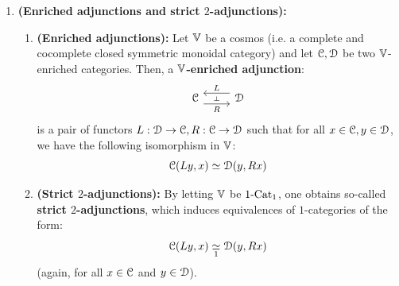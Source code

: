                 \begin{remark} \label{remark: objects_and_morphisms_of_grothendieck_constructions}
                    
                \end{remark}
                
                \begin{remark} \label{remark: 2_adjunctions}
                    \noindent
                    \begin{enumerate}
                        \item \textbf{(Enriched adjunctions and strict $2$-adjunctions):} 
                            \begin{enumerate}
                                \item \textbf{(Enriched adjunctions):} Let $\mathbb{V}$ be a cosmos (i.e. a complete and cocomplete closed symmetric monoidal category) and let $\mathcal{C}, \mathcal{D}$ be two $\mathbb{V}$-enriched categories. Then, a \textbf{$\mathbb{V}$-enriched adjunction}:
                                    $$
                                        \begin{tikzcd}
                                        	\C & \D
                                        	\arrow[""{name=0, anchor=center, inner sep=0}, "R"', shift right=2, from=1-1, to=1-2]
                                        	\arrow[""{name=1, anchor=center, inner sep=0}, "L"', shift right=2, from=1-2, to=1-1]
                                        	\arrow["\dashv"{anchor=center, rotate=-90}, draw=none, from=1, to=0]
                                        \end{tikzcd}
                                    $$
                                is a pair of functors $L: \mathcal{D} \to \mathcal{C}, R: \mathcal{C} \to \mathcal{D}$ such that for all $x \in \mathcal{C}, y \in \mathcal{D}$, we have the following isomorphism in $\mathbb{V}$:
                                    $$\mathcal{C}(Ly, x) \simeq \mathcal{D}(y, Rx)$$
                                \item \textbf{(Strict $2$-adjunctions):} By letting $\mathbb{V}$ be $1\text{-}\mathrm{Cat}_1$, one obtains so-called \textbf{strict $2$-adjunctions}, which induces equivalences of $1$-categories of the form:
                                    $$\mathcal{C}(Ly, x) \underset{1}{\simeq} \mathcal{D}(y, Rx)$$
                                (again, for all $x \in \mathcal{C}$ and $y \in \mathcal{D}$).
                            \end{enumerate}

\end{enumerate}
\end{remark}
